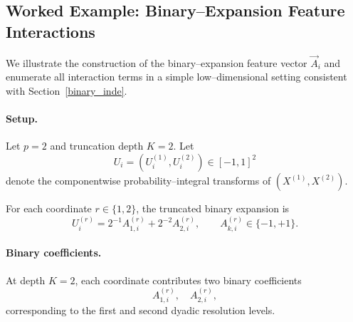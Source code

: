 \documentclass[12pt,reqno,oneside]{amsbook}
\theoremstyle{definition}
\theoremstyle{remark}
\DeclareMathOperator{\Var}{Var}
\begin{document}




\subsection{Worked Example: Binary--Expansion Feature Interactions}
\label{app:binary-example-new}

We illustrate the construction of the binary--expansion feature vector
$\vec A_i$ and enumerate all interaction terms in a simple low--dimensional
setting consistent with Section~\ref{binary_inde}.

\paragraph{Setup.}
Let $p=2$ and truncation depth $K=2$.
Let
\[
U_i = (U_i^{(1)}, U_i^{(2)}) \in [-1,1]^2
\]
denote the componentwise probability--integral transforms of
$(X^{(1)},X^{(2)})$.

For each coordinate $r\in\{1,2\}$, the truncated binary expansion is
\[
U_i^{(r)} = 2^{-1} A^{(r)}_{1,i} + 2^{-2} A^{(r)}_{2,i},
\qquad
A^{(r)}_{k,i} \in \{-1,+1\}.
\]

\paragraph{Binary coefficients.}
At depth $K=2$, each coordinate contributes two binary coefficients
\[
A^{(r)}_{1,i}, \quad A^{(r)}_{2,i},
\]
corresponding to the first and second dyadic resolution levels.
\end{document}
